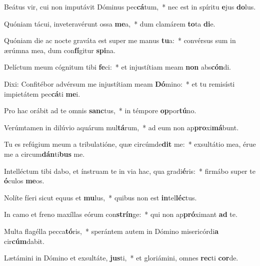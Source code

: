 \item Beátus vir, cui non imputávit Dóminus pec\textbf{cá}tum,~* nec est in spíritu \textbf{e}jus \textbf{do}lus.
\item Quóniam tácui, inveteravérunt ossa \textbf{me}a,~* dum clamárem \textbf{to}ta \textbf{di}e.
\item Quóniam die ac nocte graváta est super me manus \textbf{tu}a:~* convérsus sum in ærúmna mea, dum con\textbf{fí}gitur \textbf{spi}na.
\item Delíctum meum cógnitum tibi \textbf{fe}ci:~* et injustítiam meam \textbf{non} abs\textbf{cón}di.
\item Dixi: Confitébor advérsum me injustítiam meam \textbf{Dó}mino:~* et tu remisísti impietátem pec\textbf{cá}ti \textbf{me}i.
\item Pro hac orábit ad te omnis \textbf{sanc}tus,~* in témpore \textbf{op}por\textbf{tú}no.
\item Verúmtamen in dilúvio aquárum mul\textbf{tá}rum,~* ad eum non ap\textbf{pro}xi\textbf{má}bunt.
\item Tu es refúgium meum a tribulatióne, quæ circúmde\textbf{dit} me:~* exsultátio mea, érue me a circum\textbf{dán}ti\textbf{bus} me.
\item Intelléctum tibi dabo, et ínstruam te in via hac, qua gradi\textbf{é}ris:~* firmábo super te \textbf{ó}culos \textbf{me}os.
\item Nolíte fíeri sicut equus et \textbf{mu}lus,~* quibus non est \textbf{in}tel\textbf{léc}tus.
\item In camo et freno maxíllas eórum con\textbf{strín}ge:~* qui non ap\textbf{pró}ximant \textbf{ad} te.
\item Multa flagélla pecca\textbf{tó}ris,~* sperántem autem in Dómino misericórdi\textbf{a} cir\textbf{cúm}dabit.
\item Lætámini in Dómino et exsultáte, \textbf{jus}ti,~* et gloriámini, omnes \textbf{rec}ti \textbf{cor}de.

